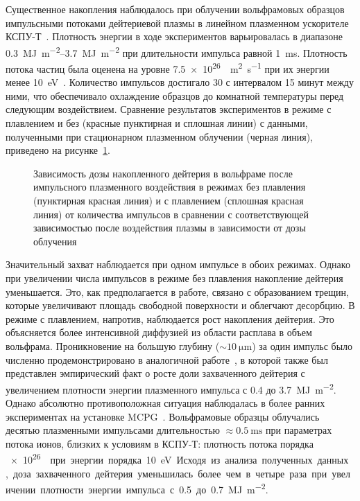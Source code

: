 Существенное накопления наблюдалось при облучении вольфрамовых образцов импульсными потоками дейтериевой плазмы в линейном плазменном ускорителе КСПУ-Т~\cite{Ogorodnikova}. Плотность энергии в ходе экспериментов варьировалась в диапазоне \SIrange{0.3}{3.7}{\mega\joule\per\meter\squared} при длительности импульса равной \SI{1}{\milli\second}. Плотность потока частиц была оценена на уровне \SI{7.5e26}{\per\meter\squared\per\second} при их энергии менее \SI{10}{\electronvolt}~\cite{Poskakalov2020}. Количество импульсов достигало 30 с интервалом 15 минут между ними, что обеспечивало охлаждение образцов до комнатной температуры перед следующим воздействием. Сравнение результатов экспериментов в режиме с плавлением и без (красные пунктирная и сплошная линии) с данными, полученными при стационарном плазменном облучении (черная линия), приведено на рисунке~\cref{fig:ch1/retention_QSPA}. 
\begin{figure}[ht]
    \caption{Зависимость дозы накопленного дейтерия в вольфраме после импульсного плазменного воздействия в режимах без плавления (пунктирная красная линия) и с плавлением (сплошная красная линия) от количества импульсов в сравнении с соответствующей зависимостью после воздействия плазмы в зависимости от дозы облучения~\cite{Ogorodnikova}}\label{fig:ch1/retention_QSPA}
\end{figure}
Значительный захват наблюдается при одном импульсе в обоих режимах. Однако при увеличении числа импульсов в режиме без плавления накопление дейтерия уменьшается. Это, как предполагается в работе, связано с образованием трещин, которые увеличивают площадь свободной поверхности и облегчают десорбцию. В режиме с плавлением, напротив, наблюдается рост накопления дейтерия. Это объясняется более интенсивной диффузией из области расплава в объем вольфрама. Проникновение на большую глубину (\( \sim \SI{10}{\micro\meter} \)) за один импульс было численно продемонстрировано в аналогичной работе~\cite{Poskakalov2020}, в которой также был представлен эмпирический факт о росте доли захваченного дейтерия с увеличением плотности энергии плазменного импульса с \num{0.4} до \SI{3.7}{\mega\joule\per\metre\squared}. Однако абсолютно противоположная ситуация наблюдалась в более ранних экспериментах на установке MCPG~\cite{Nishijima2011}. Вольфрамовые образцы облучались десятью плазменными импульсами длительностью \( \approx\SI{0.5}{\milli\second} \) при параметрах потока ионов, близких к условиям в КСПУ-Т: плотность потока порядка \SI{e26}{\per\meter\square\per\second} при энергии порядка \SI{10}{\electronvolt}. Исходя из анализа полученных данных, доза захваченного дейтерия уменьшилась более чем в четыре раза при увеличении плотности энергии импульса с \num{0.5} до \SI{0.7}{\mega\joule\per\meter\squared}.

